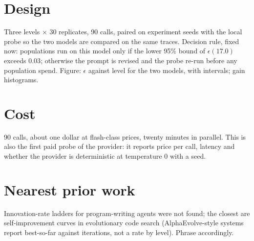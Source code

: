 \documentclass[11pt]{article}
\begin{document}
\section{Design}
Three levels $\times$ 30 replicates, 90 calls, paired on experiment seeds with the local probe so the two
models are compared on the same traces. Decision rule, fixed now: populations run on this model only if the
lower 95\% bound of $\epsilon(17.0)$ exceeds $0.03$; otherwise the prompt is revised and the probe re-run before
any population spend. Figure: $\epsilon$ against level for the two models, with intervals; gain histograms.

\section{Cost}
90 calls, about one dollar at flash-class prices, twenty minutes in parallel. This is also the first paid
probe of the provider: it reports price per call, latency and whether the provider is deterministic at
temperature 0 with a seed.

\section{Nearest prior work}
Innovation-rate ladders for program-writing agents were not found; the closest are self-improvement
curves in evolutionary code search (AlphaEvolve-style systems report best-so-far against iterations, not a rate
by level). Phrase accordingly.
\end{document}
